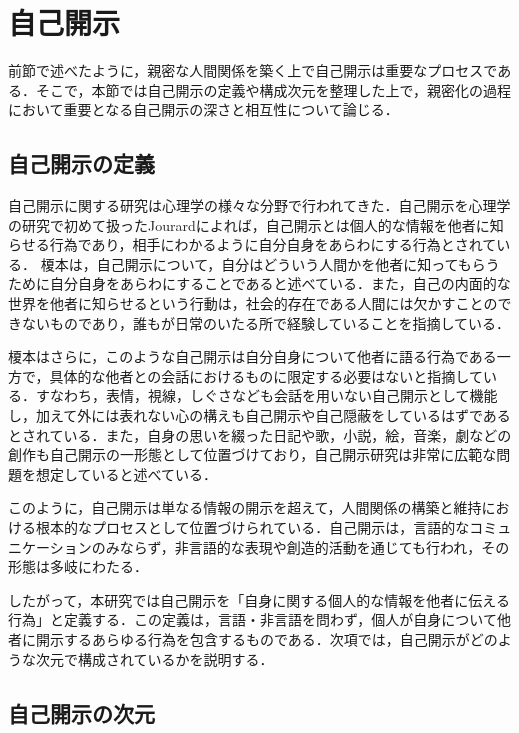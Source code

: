 \section{自己開示}\label{自己開示}

前節で述べたように，親密な人間関係を築く上で自己開示は重要なプロセスである．そこで，本節では自己開示の定義や構成次元を整理した上で，親密化の過程において重要となる自己開示の深さと相互性について論じる．

\subsection{自己開示の定義}\label{自己開示の定義}

自己開示に関する研究は心理学の様々な分野で行われてきた．自己開示を心理学の研究で初めて扱ったJourardによれば，自己開示とは個人的な情報を他者に知らせる行為であり，相手にわかるように自分自身をあらわにする行為とされている．
榎本\cite{榎本_1997_自己開示の心理学的研究}は，自己開示について，自分はどういう人間かを他者に知ってもらうために自分自身をあらわにすることであると述べている．また，自己の内面的な世界を他者に知らせるという行動は，社会的存在である人間には欠かすことのできないものであり，誰もが日常のいたる所で経験していることを指摘している．

榎本はさらに，このような自己開示は自分自身について他者に語る行為である一方で，具体的な他者との会話におけるものに限定する必要はないと指摘している．すなわち，表情，視線，しぐさなども会話を用いない自己開示として機能し，加えて外には表れない心の構えも自己開示や自己隠蔽をしているはずであるとされている．また，自身の思いを綴った日記や歌，小説，絵，音楽，劇などの創作も自己開示の一形態として位置づけており，自己開示研究は非常に広範な問題を想定していると述べている．

このように，自己開示は単なる情報の開示を超えて，人間関係の構築と維持における根本的なプロセスとして位置づけられている．自己開示は，言語的なコミュニケーションのみならず，非言語的な表現や創造的活動を通じても行われ，その形態は多岐にわたる．

したがって，本研究では自己開示を「自身に関する個人的な情報を他者に伝える行為」と定義する．この定義は，言語・非言語を問わず，個人が自身について他者に開示するあらゆる行為を包含するものである．次項では，自己開示がどのような次元で構成されているかを説明する．



\subsection{自己開示の次元}

